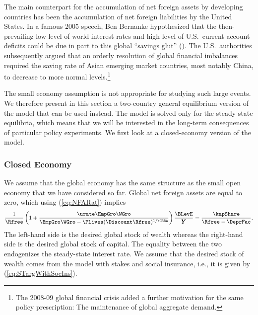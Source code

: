 \documentclass[titlepage]{\econtex}\newcommand{\texname}{cjSOE}
\renewcommand{\GDPLev}{\ensuremath{\pmb{Y}}}
\begin{document}
The main counterpart for the accumulation of net foreign assets by
developing countries has been the accumulation of net foreign
liabilities by the United States. In a famous 2005 speech, Ben
Bernanke hypothesized that the then-prevailing low level of world
interest rates and high level of U.S.\ current account deficits could
be due in part to this global ``savings glut''
(\cite{Bernanke:savingglut}). The U.S.\ authorities subsequently
argued that an orderly resolution of global financial imbalances
required the saving rate of Asian emerging market countries, most
notably China, to decrease to more normal levels.\footnote{The
    2008-09 global financial crisis added a further motivation for the
    same policy prescription: The maintenance of global aggregate
    demand.}

The small economy assumption is not appropriate for studying such
large events.  We therefore present in this section a two-country general
equilibrium version of the model that can be used instead. The model
is solved only for the steady state equilibria, which means that we
will be interested in the long-term consequences of particular policy
experiments. We first look at a closed-economy version of the model.

\subsubsection{Closed Economy}

We assume that the global economy has the same structure as the small
open economy that we have considered so far.  Global net foreign
assets are equal to zero, which using (\ref{eq:NFARat}) implies
\begin{equation}
\frac{1}{\Rfree} \left( 1 + \frac{\urate \EmpGro \WGro}{\EmpGro \WGro -\PLives(\Discount \Rfree )^{1/\CRRA}} \right) \frac{\BLevE}{\GDPLev} =\frac{\kapShare}{\Rfree-\DeprFac}.
\label{eq:closed}
\end{equation}
The left-hand side is the desired global stock of wealth whereas the
right-hand side is the desired global stock of capital. The equality
between the two endogenizes the steady-state interest rate. We assume
that the desired stock of wealth comes from the model with stakes and
social insurance, i.e., it is given by (\ref{eq:STargWithSocIns}).
\end{document}
